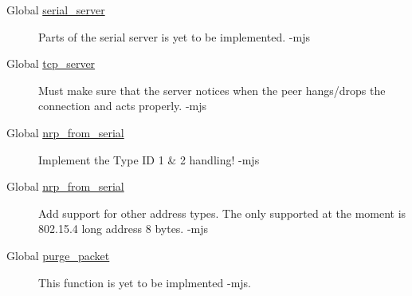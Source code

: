 \label{todo__todo000010}
\hypertarget{todo__todo000010}{}
 \begin{description}
\item[Global \hyperlink{nRouted_8c_40aea12bcf55afc06ed55efe9fc41e9b}{serial\_\-server} ]Parts of the serial server is yet to be implemented. -mjs \end{description}


\label{todo__todo000016}
\hypertarget{todo__todo000016}{}
 \begin{description}
\item[Global \hyperlink{nRouted_8c_670df12c784cbf1b260ab50397194b66}{tcp\_\-server} ]Must make sure that the server notices when the peer hangs/drops the connection and acts properly. -mjs \end{description}


\label{todo__todo000012}
\hypertarget{todo__todo000012}{}
 \begin{description}
\item[Global \hyperlink{serialserver_8c_0a07beae6fb26ce3e0e812b24126dda0}{nrp\_\-from\_\-serial} ]Implement the Type ID 1 \& 2 handling! -mjs \end{description}


\label{todo__todo000012}
\hypertarget{todo__todo000012}{}
 \begin{description}
\item[Global \hyperlink{serialserver_8c_0a07beae6fb26ce3e0e812b24126dda0}{nrp\_\-from\_\-serial} ]Add support for other address types. The only supported at the moment is 802.15.4 long address 8 bytes. -mjs \end{description}


\label{todo__todo000014}
\hypertarget{todo__todo000014}{}
 \begin{description}
\item[Global \hyperlink{serialserver_8c_d1906dfda0437f68ccc02e98ec91b6d9}{purge\_\-packet} ]This function is yet to be implmented -mjs. \end{description}


